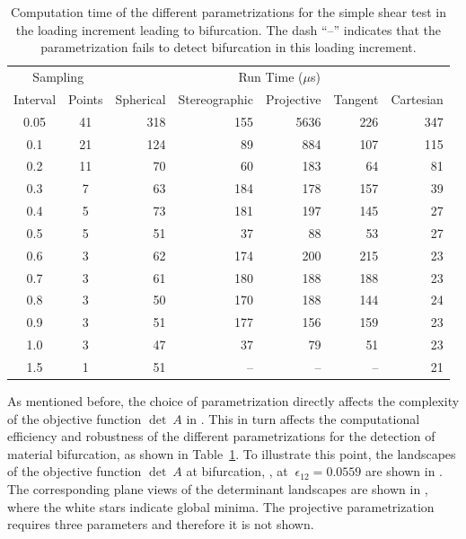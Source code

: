 \documentclass[12pt]{article}
\numberwithin{equation}{section}
\begin{document}
\begin{table}[!htbp]
  \begin{center}
    \begin{tabular}{c c | r r r r r}
      \toprule
      \multicolumn{2}{c}{Sampling} & \multicolumn{5}{c}{Run Time ($\mu$s)} \\
      Interval & Points & Spherical & Stereographic & Projective &
      Tangent & Cartesian \\
      \midrule
      0.05 & 41 & 318 & 155 & 5636 & 226 & 347  \\
      0.1 & 21 & 124 & 89  & 884 & 107 & 115  \\
      0.2 & 11 & 70 & 60  & 183 & 64  & 81  \\
      0.3 & 7 & 63 & 184 & 178 & 157 & 39  \\
      0.4 & 5 & 73 & 181 & 197 & 145 & 27  \\
      0.5 & 5 & 51 & 37  & 88  & 53  & 27  \\
      0.6 & 3 & 62 & 174 & 200 & 215 & 23  \\
      0.7 & 3 & 61 & 180 & 188 & 188 & 23  \\
      0.8 & 3 & 50 & 170 & 188 & 144 & 24  \\
      0.9 & 3 & 51 & 177 & 156 & 159 & 23  \\
      1.0 & 3 & 47 & 37  & 79  & 51  & 23  \\
      1.5 & 1 & 51 & -- & --  & -- & 21  \\
      \bottomrule
    \end{tabular}
    \caption{Computation time of the different parametrizations for
      the simple shear test in the loading increment leading to
      bifurcation.  The dash ``--'' indicates that the parametrization
      fails to detect bifurcation in this loading increment.}
    \label{tab:iso-shear-runtime}
  \end{center}
\end{table}

As mentioned before, the choice of parametrization directly affects
the complexity of the objective function $\det~A$ in
. This in turn affects the
computational efficiency and robustness of the different
parametrizations for the detection of material bifurcation, as shown
in Table~\ref{tab:iso-shear-runtime}. To illustrate this point, the
landscapes of the objective function $\det~A$ at bifurcation, \ie, at
$~\epsilon_{12}=0.0559$ are shown in . The
corresponding plane views of the determinant landscapes are shown in
, where the white stars indicate global
minima. The projective parametrization requires three parameters and
therefore it is not shown.
\end{document}
